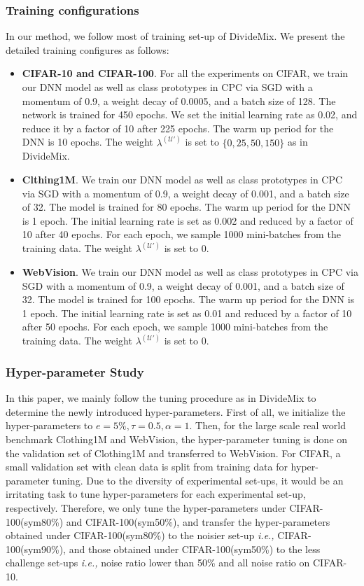 \documentclass{article} \usepackage{iclr2023_conference,times}
\begin{document}
\subsubsection{Training configurations}
In our method, we follow most of training set-up of DivideMix\citep{Li2020DivideMixLW}. We present the detailed training configures as follows:
\begin{itemize}
    \item \textbf{CIFAR-10 and CIFAR-100}. For all the experiments on CIFAR, we train our DNN model as well as class prototypes in CPC via SGD with a momentum of 0.9, a weight decay of 0.0005, and a batch size of 128. The network is trained for 450 epochs. We set the initial learning rate as 0.02, and reduce it by a factor of 10 after 225 epochs. The warm up period for the DNN is 10 epochs. The weight $\lambda^{(\mathcal{U'})}$ is set to $\{0,25,50,150\}$ as in DivideMix.
    \item \textbf{Clthing1M}. We train our DNN model as well as class prototypes in CPC via SGD with a momentum of 0.9, a weight decay of 0.001, and a batch size of 32. The model is trained for 80 epochs. The warm up period for the DNN is 1 epoch. The initial learning rate is set as 0.002 and reduced by a factor of 10 after 40 epochs. For each epoch, we sample 1000 mini-batches from the training data. The weight $\lambda^{(\mathcal{U'})}$ is set to 0.
    \item \textbf{WebVision}. We train our DNN model as well as class prototypes in CPC via SGD with a momentum of 0.9, a weight decay of 0.001, and a batch size of 32. The model is trained for 100 epochs. The warm up period for the DNN is 1 epoch. The initial learning rate is set as 0.01 and reduced by a factor of 10 after 50 epochs. For each epoch, we sample 1000 mini-batches from the training data. The weight $\lambda^{(\mathcal{U'})}$ is set to 0.
\end{itemize}

\subsubsection{Hyper-parameter Study}
In this paper, we mainly follow the tuning procedure as in DivideMix to determine the newly introduced hyper-parameters. First of all, we initialize the hyper-parameters to $e=5\%, \tau=0.5, \alpha=1$. Then,  for the large scale real world benchmark Clothing1M and WebVision, the hyper-parameter tuning is done on the validation set of Clothing1M and transferred to WebVision. For CIFAR, a small validation set with clean data is split from training data for hyper-parameter tuning. Due to the diversity of experimental set-ups, it would be an irritating task to tune hyper-parameters for each experimental set-up, respectively. Therefore, we only tune the hyper-parameters under CIFAR-100(sym80\%) and CIFAR-100(sym50\%), and transfer the hyper-parameters obtained  under CIFAR-100(sym80\%) to the noisier set-up \emph{i.e.,} CIFAR-100(sym90\%), and those obtained under CIFAR-100(sym50\%) to the less challenge set-ups \emph{i.e.,} noise ratio lower than 50\%  and all noise ratio on CIFAR-10. 
\end{document}

